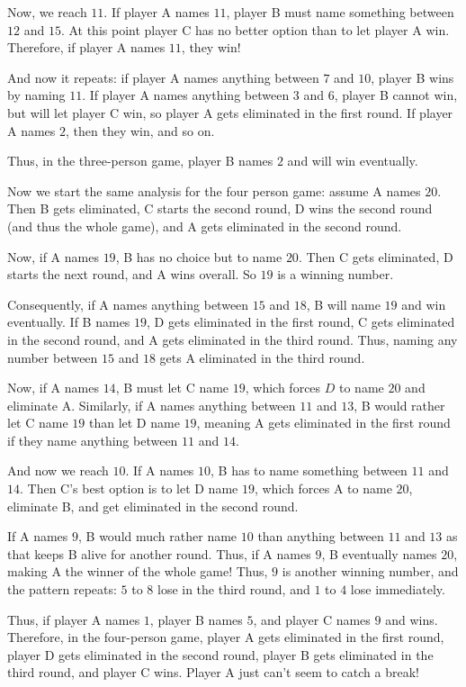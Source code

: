 \documentclass[11pt]{article}
\theoremstyle{definition}
\begin{document}
Now, we reach $11$.  If player A names $11$, player B must name something between $12$ and $15$.  At this point player C has no better option than to let player A win.  Therefore, if player A names $11$, they win!

And now it repeats: if player A names anything between $7$ and $10$, player B wins by naming $11$.  If player A names anything between $3$ and $6$, player B cannot win, but will let player C win, so player A gets eliminated in the first round.  If player A names $2$, then they win, and so on.

Thus, in the three-person game, player B names $2$ and will win eventually.

Now we start the same analysis for the four person game: assume A names $20$.  Then B gets eliminated, C starts the second round, D wins the second round (and thus the whole game), and A gets eliminated in the second round.

Now, if A names $19$, B has no choice but to name $20$.  Then C gets eliminated, D starts the next round, and A wins overall.  So $19$ is a winning number.

Consequently, if A names anything between $15$ and $18$, B will name $19$ and win eventually.  If B names $19$, D gets eliminated in the first round, C gets eliminated in the second round, and A gets eliminated in the third round.  Thus, naming any number between $15$ and $18$ gets A eliminated in the third round.

Now, if A names $14$, B must let C name $19$, which forces $D$ to name $20$ and eliminate A.  Similarly, if A names anything between $11$ and $13$, B would rather let C name $19$ than let D name $19$, meaning A gets eliminated in the first round if they name anything between $11$ and $14$.

And now we reach $10$.  If A names $10$, B has to name something between $11$ and $14$.  Then C's best option is to let D name $19$, which forces A to name $20$, eliminate B, and get eliminated in the second round.

If A names $9$, B would much rather name $10$ than anything between $11$ and $13$ as that keeps B alive for another round.  Thus, if A names $9$, B eventually names $20$, making A the winner of the whole game!  Thus, $9$ is another winning number, and the pattern repeats: $5$ to $8$ lose in the third round, and $1$ to $4$ lose immediately.

Thus, if player A names $1$, player B names $5$, and player C names $9$ and wins.  Therefore, in the four-person game, player A gets eliminated in the first round, player D gets eliminated in the second round, player B gets eliminated in the third round, and player C wins.  Player A just can't seem to catch a break!
\end{document}
